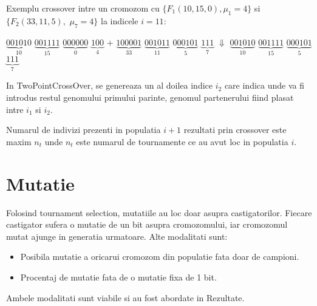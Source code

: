 Exemplu crossover intre un cromozom cu $\{F_{1}(10,15,0), \mu_{1} = 4\}$ si $\{F_{2}(33,11,5),$ \linebreak $\mu_{7} = 4\}$ la indicele $i=11$:
\begin{center}
    $\underbrace{001010}_{10}$ $\underbrace{001111}_{15}$ $\underbrace{000000}_{0}$ $\underbrace{100}_{4}$ \linebreak \linebreak
    $+$ \linebreak
    $\underbrace{100001}_{33}$ $\underbrace{001011}_{11}$ $\underbrace{000101}_{5}$ $\underbrace{111}_{7}$ \linebreak \linebreak
    $\Downarrow$ \linebreak
    $\underbrace{001010}_{10}$ $\underbrace{001111}_{15}$ $\underbrace{000101}_{5}$ $\underbrace{111}_{7}$ \linebreak \linebreak
\end{center}

In TwoPointCrossOver, se genereaza un al doilea indice $i_{2}$ care indica unde va fi introdus restul genomului primului parinte, genomul partenerului fiind plasat intre $i_{1}$ si $i_{2}$.

Numarul de indivizi prezenti in populatia $i+1$ rezultati prin crossover este maxim $n_{t}$ unde $n_{t}$ este numarul de tournamente ce au avut loc in populatia $i$.
\section{Mutatie}

Folosind tournament selection, mutatiile au loc doar asupra castigatorilor. Fiecare castigator sufera o mutatie de un bit asupra cromozomului, iar cromozomul mutat ajunge in generatia urmatoare. Alte modalitati sunt: 

\begin{itemize}
    \item Posibila mutatie a oricarui cromozom din populatie fata doar de campioni.
    \item Procentaj de mutatie fata de o mutatie fixa de 1 bit.
\end{itemize}

Ambele modalitati sunt viabile si au fost abordate in Rezultate.
